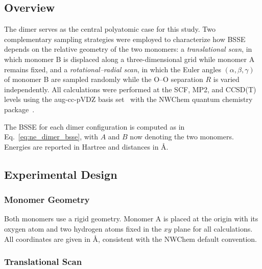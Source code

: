 \subsection{Overview}

The  dimer serves as the central polyatomic case for this
study. Two complementary sampling strategies were employed to
characterize how BSSE depends on the relative geometry of the two
monomers: a \textit{translational scan}, in which monomer B is
displaced along a three-dimensional grid while monomer A remains
fixed, and a \textit{rotational--radial scan}, in which the Euler
angles $(\alpha, \beta, \gamma)$ of monomer B are sampled randomly
while the O--O separation $R$ is varied independently. All
calculations were performed at the SCF, MP2, and CCSD(T) levels using
the aug-cc-pVDZ basis set~\cite{dunning1989,kendall1992} with the
NWChem quantum chemistry package~\cite{nwchem2020}.

The BSSE for each dimer configuration is computed as in
Eq.~\eqref{eq:ne_dimer_bsse}, with $A$ and $B$ now denoting the two
 monomers. Energies are reported in Hartree and distances
in \AA.

\subsection{Experimental Design}

\subsubsection{Monomer Geometry}

Both monomers use a rigid  geometry. Monomer A is placed at
the origin with its oxygen atom and two hydrogen atoms fixed in the
$xy$ plane for all calculations. All coordinates are given in \AA,
consistent with the NWChem default convention.

\subsubsection{Translational Scan}

